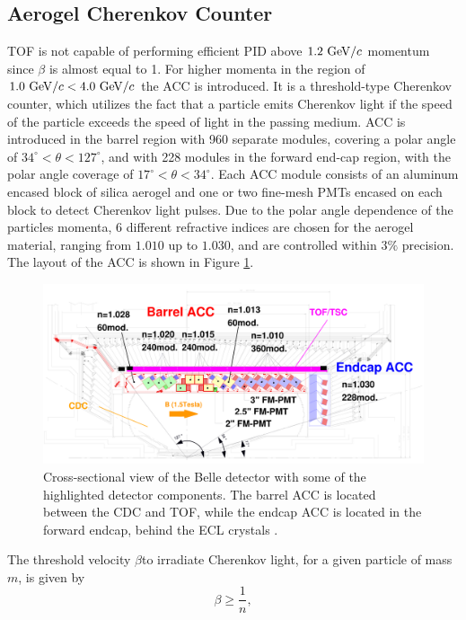 \subsection{Aerogel Cherenkov Counter}
TOF is not capable of performing efficient PID above $1.2\mathrm{~GeV}/c$ momentum since $\beta$ is almost equal to 1. For higher momenta in the region of $1.0\mathrm{~GeV}/c < 4.0\mathrm{~GeV}/c$ the ACC is introduced. It is a threshold-type Cherenkov counter, which utilizes the fact that a particle emits Cherenkov light if the speed of the particle exceeds the speed of light in the passing medium. ACC is introduced in the barrel region with 960 separate modules, covering a polar angle of $34^\circ < \theta < 127^\circ$, and with 228 modules in the forward end-cap region, with the polar angle coverage of $17^\circ < \theta < 34^\circ$. Each ACC module consists of an aluminum encased block of silica aerogel and one or two fine-mesh PMTs encased on each block to detect Cherenkov light pulses. Due to the polar angle dependence of the particles momenta, 6 different refractive indices are chosen for the aerogel material, ranging from $1.010$ up to $1.030$, and are controlled within $3\%$ precision. The layout of the ACC is shown in Figure \ref{fig:ACC_layout}.
\begin{figure}[H]
	\centering
	\captionsetup{width=0.8\linewidth}
	\includegraphics[width=\linewidth]{fig/setup/ACC_layout}
	\caption{Cross-sectional view of the Belle detector with some of the highlighted detector components. The barrel ACC is located between the CDC and TOF, while the endcap ACC is located in the forward endcap, behind the ECL crystals \cite{ABASHIAN2002117}.}
	\label{fig:ACC_layout}
\end{figure}
The threshold velocity $\beta $to irradiate Cherenkov light, for a given particle of mass $m$, is given by
\begin{equation}
\beta \geq \frac{1}{n},
\end{equation}
